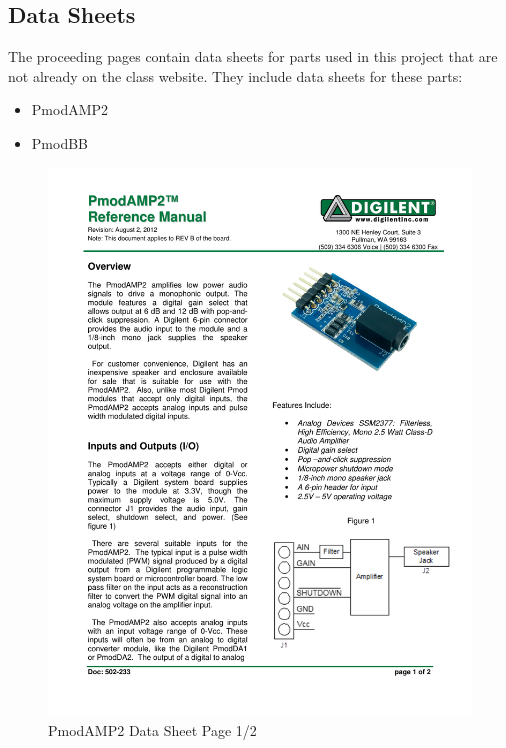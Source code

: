 \documentclass{article}
\begin{document}
	\subsection{Data Sheets}

	  	The proceeding pages contain data sheets for parts used in this project that are not already on the class website. They include data sheets for these parts:

		\begin{itemize}
			\item PmodAMP2
			\item PmodBB
	    \end{itemize}  	

		\begin{figure}[H]
		  	\centering
		  	\includegraphics[width=6.5in]{additionalDataSheets/PmodAMP2}
		  	\caption{PmodAMP2 Data Sheet Page 1/2}
		\end{figure}
\end{document}
